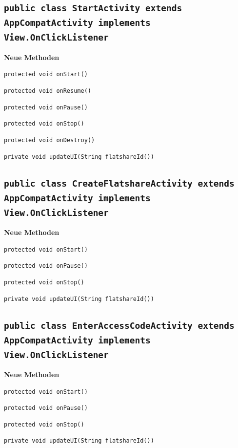 \documentclass[a4paper]{scrreprt}
\begin{document}
	\subsection{\texttt{public class StartActivity extends AppCompatActivity implements View.OnClickListener}}
		\textbf{Neue Methoden}
			\item \texttt{protected void onStart()}
			\item \texttt{protected void onResume()}
			\item \texttt{protected void onPause()}
			\item \texttt{protected void onStop()}
			\item \texttt{protected void onDestroy()}
			\item \texttt{private void updateUI(String flatshareId())}
			
	\subsection{\texttt{public class CreateFlatshareActivity extends AppCompatActivity implements View.OnClickListener}}
		\textbf{Neue Methoden}
			\item \texttt{protected void onStart()}
			\item \texttt{protected void onPause()}
			\item \texttt{protected void onStop()}
			\item \texttt{private void updateUI(String flatshareId())}
	
	\subsection{\texttt{public class EnterAccessCodeActivity extends AppCompatActivity implements View.OnClickListener}}
		\textbf{Neue Methoden}
			\item \texttt{protected void onStart()}
			\item \texttt{protected void onPause()}
			\item \texttt{protected void onStop()}
			\item \texttt{private void updateUI(String flatshareId())}
			
\end{document}
